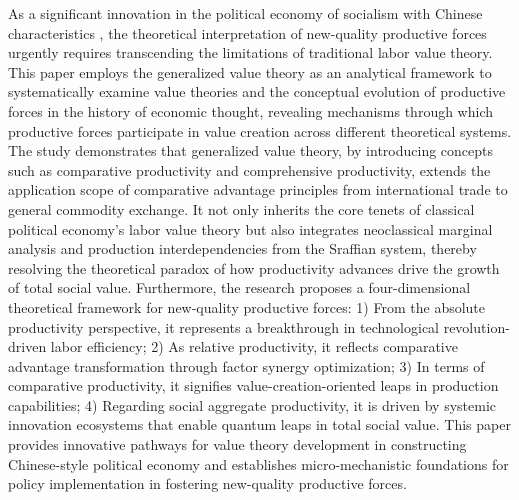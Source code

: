 \begin{abstract*}

As a significant innovation in the political economy of socialism with Chinese characteristics
, the theoretical interpretation of new-quality productive forces urgently requires transcending the limitations of traditional labor value theory. This paper employs the generalized value theory as an analytical framework to systematically examine value theories and the conceptual evolution of productive forces in the history of economic thought, revealing mechanisms through which productive forces participate in value creation across different theoretical systems. The study demonstrates that generalized value theory, by introducing concepts such as comparative productivity and comprehensive productivity, extends the application scope of comparative advantage principles from international trade to general commodity exchange. It not only inherits the core tenets of classical political economy's labor value theory but also integrates neoclassical marginal analysis and production interdependencies from the Sraffian system, thereby resolving the theoretical paradox of how productivity advances drive the growth of total social value. Furthermore, the research proposes a four-dimensional theoretical framework for new-quality productive forces: 1) From the absolute productivity perspective, it represents a breakthrough in technological revolution-driven labor efficiency; 2) As relative productivity, it reflects comparative advantage transformation through factor synergy optimization; 3) In terms of comparative productivity, it signifies value-creation-oriented leaps in production capabilities; 4) Regarding social aggregate productivity, it ​is driven by systemic innovation ecosystems that enable quantum leaps in total social value. This paper provides innovative pathways for value theory development in constructing Chinese-style political economy and establishes micro-mechanistic foundations for policy implementation in fostering new-quality productive forces.


\end{abstract*}
